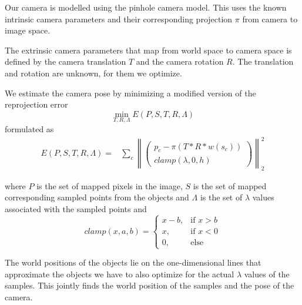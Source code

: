 Our camera is modelled using the pinhole camera model. 
This uses the known intrinsic camera parameters and their corresponding projection $\pi$ from camera to image space.

The extrinsic camera parameters that map from world space to camera space is defined by the camera translation $T$ and the camera rotation $R$.
The translation and rotation are unknown, for them we optimize. 

We estimate the camera pose by minimizing a modified version of the reprojection error 
\begin{equation}
  \min_{T, R, \Lambda} E(P, S, T, R, \Lambda) 
\end{equation}
formulated as
\begin{equation}
  \begin{split}
  E(P, S, T, R, \Lambda ) =& 
  \sum_{c} 
  \left\lVert 
  \begin{pmatrix}
    p_c - \pi(T * R * w(s_c))\\
    clamp(\lambda, 0, h)
  \end{pmatrix}
  \right\rVert_2^2 
\end{split}
\end{equation}

where $P$ is the set of mapped pixels in the image, $S$ is the set of mapped corresponding sampled points from the objects and $\Lambda$ is the set of $\lambda$ values associated with the sampled points and
\begin{equation}
    clamp(x, a, b) =
    \begin{cases}
      x - b,& \text{if } x > b\\
      x,    & \text{if } x < 0\\
      0,    & \text{else}
    \end{cases} 
\end{equation}

The world positions of the objects lie on the one-dimensional lines that approximate the objects we have to also optimize for the actual $\lambda$ values of the samples.
This jointly finds the world position of the samples and the pose of the camera.


